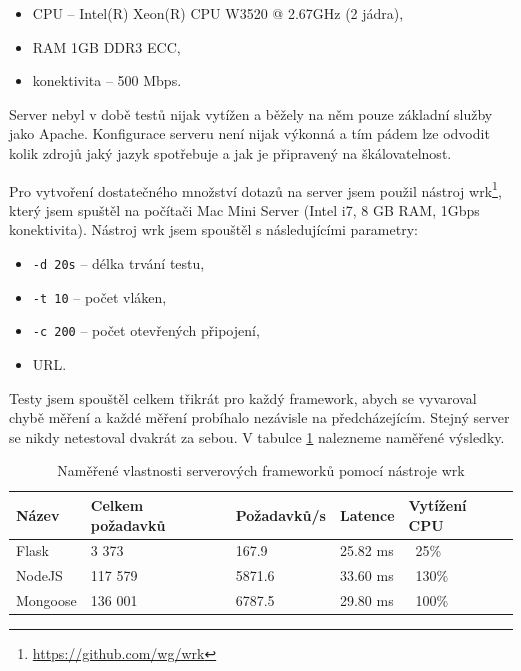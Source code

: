 \begin{itemize}
    \item CPU -- Intel(R) Xeon(R) CPU W3520  @ 2.67GHz (2 jádra),
    \item RAM 1GB DDR3 ECC,
    \item konektivita -- 500 Mbps.
\end{itemize}

Server nebyl v době testů nijak vytížen a běžely na něm pouze základní služby jako Apache. Konfigurace serveru není nijak výkonná a tím pádem lze odvodit kolik zdrojů jaký jazyk spotřebuje a jak je připravený na škálovatelnost.

Pro vytvoření dostatečného množství dotazů na server jsem použil nástroj wrk\footnote{\url{https://github.com/wg/wrk}}, který jsem spuštěl na počítači Mac Mini Server (Intel i7, 8 GB RAM, 1Gbps konektivita). Nástroj wrk jsem spouštěl s následujícími parametry:

\begin{itemize}
    \item \texttt{-d 20s} -- délka trvání testu,
    \item \texttt{-t 10} -- počet vláken,
    \item \texttt{-c 200} -- počet otevřených připojení,
    \item URL.
\end{itemize}

Testy jsem spouštěl celkem třikrát pro každý framework, abych se vyvaroval chybě měření a každé měření probíhalo nezávisle na předcházejícím. Stejný server se nikdy netestoval dvakrát za sebou. V tabulce \ref{tab:server} nalezneme naměřené výsledky.

\begin{table}[h]
\centering
\caption{Naměřené vlastnosti serverových frameworků pomocí nástroje wrk}
\label{tab:server}
\begin{tabular}{|l|l|l|l|l|}
\hline
    Název       & Celkem požadavků  & Požadavků/s   & Latence   & Vytížení CPU\\ \hline
    Flask       & 3 373             & 167.9         & 25.82 ms  & ~25\%\\
    NodeJS      & 117 579           & 5871.6        & 33.60 ms  & ~130\%\\
    Mongoose    & 136 001           & 6787.5        & 29.80 ms  & ~100\%\\
   \hline
\end{tabular}
\end{table}


